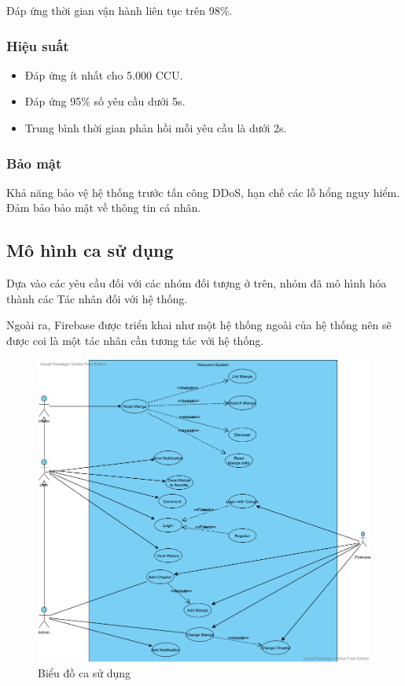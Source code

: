 \documentclass[./../main.tex]{subfiles}
\begin{document}
Đáp ứng thời gian vận hành liên tục trên 98\%.

\subsubsection{Hiệu suất}

\begin{itemize}
	\item Đáp ứng ít nhất cho 5.000 CCU.
	\item Đáp ứng 95\% số yêu cầu dưới 5s.
	\item Trung bình thời gian phản hồi mỗi yêu cầu là dưới 2s.
\end{itemize}

\subsubsection{Bảo mật}

Khả năng bảo vệ hệ thống trước tấn công DDoS, hạn chế các lỗ hổng nguy hiểm. Đảm bảo bảo mật về thông tin cá nhân.

\subsection{Mô hình ca sử dụng}

Dựa vào các yêu cầu đối với các nhóm đối tượng ở trên, nhóm đã mô hình hóa thành các Tác nhân đối với hệ thống.

Ngoài ra, Firebase được triển khai như một hệ thống ngoài của hệ thống nên sẽ được coi là một tác nhân cần tương tác với hệ thống.

\begin{figure}[H]
	\centering
	\includegraphics[width=\linewidth]{./images/image6.png}
	\caption{Biểu đồ ca sử dụng}
\end{figure}
\end{document}
